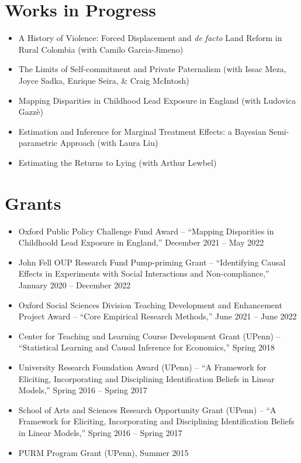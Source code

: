 \documentclass[line,overlapped]{myres}
\begin{document}
\begin{resume}
\section{\sc Works in Progress}
\begin{itemize}
  \item A History of Violence: Forced Displacement and \emph{de facto} Land Reform in Rural Colombia (with Camilo Garcia-Jimeno)
  \item The Limits of Self-commitment and Private Paternalism (with Issac Meza, Joyce Sadka, Enrique Seira, \& Craig McIntosh)
  \item Mapping Disparities in Childhood Lead Exposure in England (with Ludovica Gazz\`e) 
  \item Estimation and Inference for Marginal Treatment Effects: a Bayesian Semi-parametric Approach (with Laura Liu)
  \item Estimating the Returns to Lying (with Arthur Lewbel)
\end{itemize}

\section{\sc Grants}
\begin{itemize}
  \item Oxford Public Policy Challenge Fund Award -- ``Mapping Disparities in Childhoold Lead Exposure in England,'' December 2021 -- May 2022 %
  \item John Fell OUP Research Fund Pump-priming Grant -- ``Identifying Causal Effects in Experiments with Social Interactions and Non-compliance,'' January 2020 -- December 2022 %
  \item Oxford Social Sciences Division Teaching Development and Enhancement Project Award -- ``Core Empirical Research Methods,'' June 2021 -- June 2022 %
  \item Center for Teaching and Learning Course Development Grant (UPenn) -- ``Statistical Learning and Causal Inference for Economics,'' Spring 2018 %
  \item University Research Foundation Award (UPenn) -- ``A Framework for Eliciting, Incorporating and Disciplining Identification Beliefs in Linear Models,'' Spring 2016 -- Spring 2017 %
  \item School of Arts and Sciences Research Opportunity Grant (UPenn) -- ``A Framework for Eliciting, Incorporating and Disciplining Identification Beliefs in Linear Models,'' Spring 2016 -- Spring 2017  %
  \item PURM Program Grant (UPenn), Summer 2015 %
\end{itemize}



\end{resume}
\end{document}
